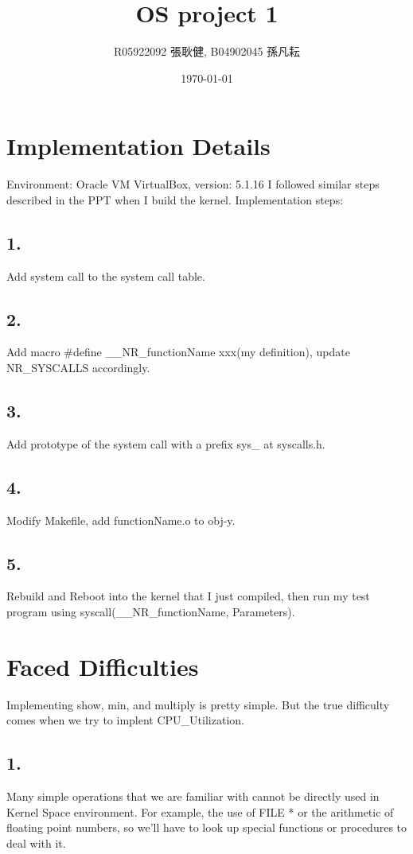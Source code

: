 \documentclass{article}
\title{OS project 1}
\author{R05922092 張耿健, B04902045 孫凡耘}
\date{\today}
\begin{document}
\maketitle

    \section{Implementation Details}
        Environment: Oracle VM VirtualBox, version: 5.1.16\newline
        I followed similar steps described in the PPT when I build the kernel.\newline
        Implementation steps:
        \subsection*{1.}
            Add system call to the system call table.
        \subsection*{2.}
            Add macro \#define \_\_NR\_functionName xxx(my definition), update NR\_SYSCALLS accordingly.
        \subsection*{3.}
            Add prototype of the system call with a prefix sys\_ at syscalls.h.
        \subsection*{4.}
            Modify Makefile, add functionName.o to obj-y.
        \subsection*{5.}
            Rebuild and Reboot into the kernel that I just compiled, then run my test program using syscall(\_\_NR\_functionName, Parameters).

    \section{Faced Difficulties}
        Implementing show, min, and multiply is pretty simple. But the true difficulty comes when we try to implent CPU\_Utilization.\newline
        \subsection*{1.} Many simple operations that we are familiar with cannot be directly used in Kernel Space environment. For example, the use of FILE * or the arithmetic of floating point numbers, so we'll have to look up special functions or procedures to deal with it.
\end{document}
